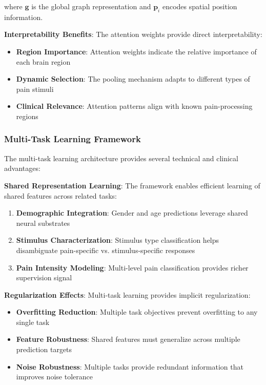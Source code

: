 \documentclass[10pt,journal,compsoc]{IEEEtran}
\begin{document}
where $\mathbf{g}$ is the global graph representation and $\mathbf{p}_i$ encodes spatial position information.

\textbf{Interpretability Benefits}:
The attention weights provide direct interpretability:

\begin{itemize}
\item \textbf{Region Importance}: Attention weights indicate the relative importance of each brain region
\item \textbf{Dynamic Selection}: The pooling mechanism adapts to different types of pain stimuli
\item \textbf{Clinical Relevance}: Attention patterns align with known pain-processing regions
\end{itemize}

\subsubsection{Multi-Task Learning Framework}

The multi-task learning architecture provides several technical and clinical advantages:

\textbf{Shared Representation Learning}:
The framework enables efficient learning of shared features across related tasks:

\begin{enumerate}
\item \textbf{Demographic Integration}: Gender and age predictions leverage shared neural substrates
\item \textbf{Stimulus Characterization}: Stimulus type classification helps disambiguate pain-specific vs. stimulus-specific responses
\item \textbf{Pain Intensity Modeling}: Multi-level pain classification provides richer supervision signal
\end{enumerate}

\textbf{Regularization Effects}:
Multi-task learning provides implicit regularization:

\begin{itemize}
\item \textbf{Overfitting Reduction}: Multiple task objectives prevent overfitting to any single task
\item \textbf{Feature Robustness}: Shared features must generalize across multiple prediction targets
\item \textbf{Noise Robustness}: Multiple tasks provide redundant information that improves noise tolerance
\end{itemize}
\end{document}
